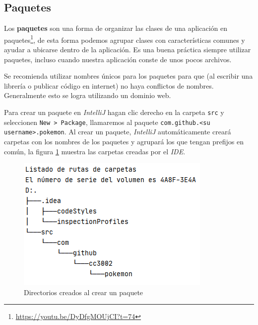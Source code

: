 \subsection{Paquetes}
  Los \textbf{paquetes} son una forma de organizar las clases de una aplicación en 
  paquetes\footnote{\url{https://youtu.be/DyDfgMOUjCI?t=74}}, de esta forma podemos agrupar clases 
  con características comunes y ayudar a ubicarse dentro de la aplicación.
  Es una buena práctica siempre utilizar paquetes, incluso cuando nuestra aplicación conste de unos 
  pocos archivos.

  Se recomienda utilizar nombres únicos para los paquetes para que (al escribir una librería o 
  publicar código en internet) no haya conflictos de nombres.
  Generalmente esto se logra utilizando un dominio web.

  Para crear un paquete en \textit{IntelliJ} hagan clic derecho en la carpeta \texttt{src} y 
  seleccionen \texttt{New > Package}, llamaremos al paquete 
  \texttt{com.github.<su username>.pokemon}.
  Al crear un paquete, \textit{IntelliJ} automáticamente creará carpetas con los nombres de los 
  paquetes y agrupará los que tengan prefijos en común, la figura \ref{fig:package-fs} muestra las 
  carpetas creadas por el \textit{IDE}.

  \begin{figure}[ht!]
    \centering
    \includegraphics[scale=0.7]{img/Profundizando en Java/IntelliJ Package Tree.png}
    \caption{Directorios creados al crear un paquete}
    \label{fig:package-fs}
  \end{figure}
%